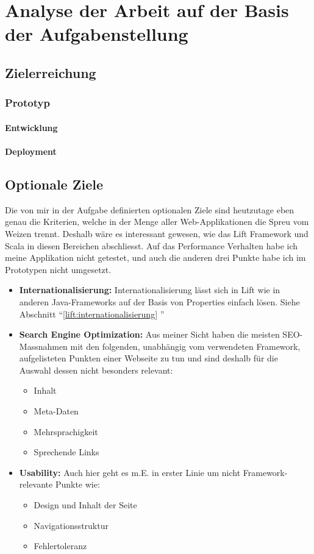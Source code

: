
\chapter{Analyse der Arbeit auf der Basis der Aufgabenstellung}
\section{Zielerreichung}
\subsection{Prototyp}
\subsubsection{Entwicklung}
\subsubsection{Deployment}

\section{Optionale Ziele}
Die von mir in der Aufgabe definierten optionalen Ziele sind heutzutage eben genau die Kriterien, welche in der Menge aller Web-Applikationen die Spreu vom Weizen trennt. Deshalb w\"are es interessant gewesen, wie das Lift Framework und Scala in diesen Bereichen abschliesst. Auf das Performance Verhalten habe ich meine Applikation nicht getestet, und auch die anderen drei Punkte habe ich im Prototypen nicht umgesetzt. 
\begin{itemize}
\item  \textbf{Internationalisierung: } Internationalisierung l\"asst sich in Lift wie in anderen Java-Frameworks auf der Basis von Properties einfach l\"osen. Siehe Abschnitt ``\ref{lift:internationalisierung} ''
\item \textbf{Search Engine Optimization: }Aus meiner Sicht haben die meisten SEO-Massnahmen mit den folgenden, unabh\"angig vom verwendeten Framework, aufgelisteten Punkten einer Webseite zu tun und sind deshalb f\"ur die Auswahl dessen nicht besonders relevant:
\begin{itemize}
\item Inhalt
\item Meta-Daten
\item Mehrsprachigkeit
\item Sprechende Links
\end{itemize}
\item \textbf{Usability: } Auch hier geht es m.E. in erster Linie um nicht Framework-relevante Punkte wie:
\begin{itemize}
\item Design und Inhalt der Seite
\item Navigationsstruktur
\item Fehlertoleranz
\end{itemize}
\end{itemize}

